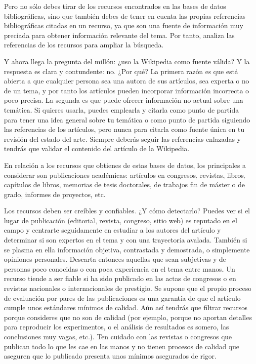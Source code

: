 Pero no sólo debes tirar de los recursos encontrados en las bases de datos bibliográficas, sino que también debes de tener en cuenta las propias referencias bibliográficas citadas en un recurso, ya que son una fuente de información muy preciada para obtener información relevante del tema. Por tanto, analiza las referencias de los recursos para ampliar la búsqueda.

Y ahora llega la pregunta del millón: ¿uso la Wikipedia como fuente válida? Y la respuesta es clara y contundente: no. ¿Por qué? La primera razón es que está abierta a que cualquier persona sea una autora de sus artículos, sea experta o no de un tema, y por tanto los artículos pueden incorporar información incorrecta o poco precisa. La segunda es que puede ofrecer información no actual sobre una temática. Si quieres usarla, puedes emplearla y citarla como punto de partida para tener una idea general sobre tu temática o como punto de partida siguiendo las referencias de los artículos, pero nunca para citarla como fuente única en tu revisión del estado del arte. Siempre deberás seguir las referencias enlazadas y tendrás que validar el contenido del artículo de la Wikipedia. 

En relación a los recursos que obtienes de estas bases de datos, los principales a considerar son publicaciones académicas: artículos en congresos, revistas, libros, capítulos de libros, memorias de tesis doctorales, de trabajos fin de máster o de grado, informes de proyectos, etc. 

Los recursos deben ser creíbles y confiables. ¿Y cómo detectarlo? Puedes ver si el lugar de publicación (editorial, revista, congreso, sitio web) es reputado en el campo y centrarte seguidamente en estudiar a los autores del artículo y determinar si son expertos en el tema y con una trayectoria avalada. También si se plasma en ella información objetiva, contrastada y demostrada, o simplemente opiniones personales. Descarta entonces aquellas que sean subjetivas y de personas poco conocidas o con poca experiencia en el tema entre manos. Un recurso tiende a ser fiable si ha sido publicado en las actas de congresos o en revistas nacionales o internacionales de prestigio. Se supone que el propio proceso de evaluación por pares de las publicaciones es una garantía de que el artículo cumple unos estándares mínimos de calidad. Aún así tendrás que filtrar recursos porque consideres que no son de calidad (por ejemplo, porque no aportan detalles para reproducir los experimentos, o el análisis de resultados es somero, las conclusiones muy vagas, etc.). Ten cuidado con las revistas o congresos que publican todo lo que les cae en las manos y no tienen procesos de calidad que aseguren que lo publicado presenta unos mínimos asegurados de rigor.

